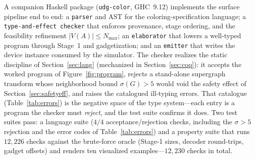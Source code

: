 \documentclass[11pt]{article}
\theoremstyle{definition}
\theoremstyle{remark}
\begin{document}
A companion Haskell package (\texttt{udg-color}, GHC~9.12) implements the surface
pipeline end to end: a \texttt{parser} and AST for the coloring-specification
language; a \texttt{type-and-effect checker} that enforces provenance, stage
ordering, and the feasibility refinement $|V(A)|\le N_{\max}$; an
\texttt{elaborator} that lowers a well-typed program through Stage~1 and
gadgetization; and an \texttt{emitter} that writes the device instance consumed by
the simulator. The checker realizes the static discipline of
Section~\ref{sec:lang} (mechanized in Section~\ref{sec:coq}): it accepts the worked
program of Figure~\ref{fig:program}, rejects a stand-alone supergraph transform
whose neighborhood bound $\sigma(G)>5$ would void the safety effect of
Section~\ref{sec:safetyeff}, and raises the catalogued ill-typing errors. That
catalogue (Table~\ref{tab:errors}) is the negative space of the type system---each
entry is a program the checker must \emph{reject}, and the test suite confirms it
does. Two test suites pass: a language suite ($4/4$ acceptance/rejection checks,
including the $\sigma>5$ rejection and the error codes of Table~\ref{tab:errors})
and a property suite that runs $12{,}226$ checks against the brute-force oracle
(Stage-1 sizes, decoder round-trips, gadget offsets) and renders ten visualized
examples---$12{,}230$ checks in total.
\end{document}
